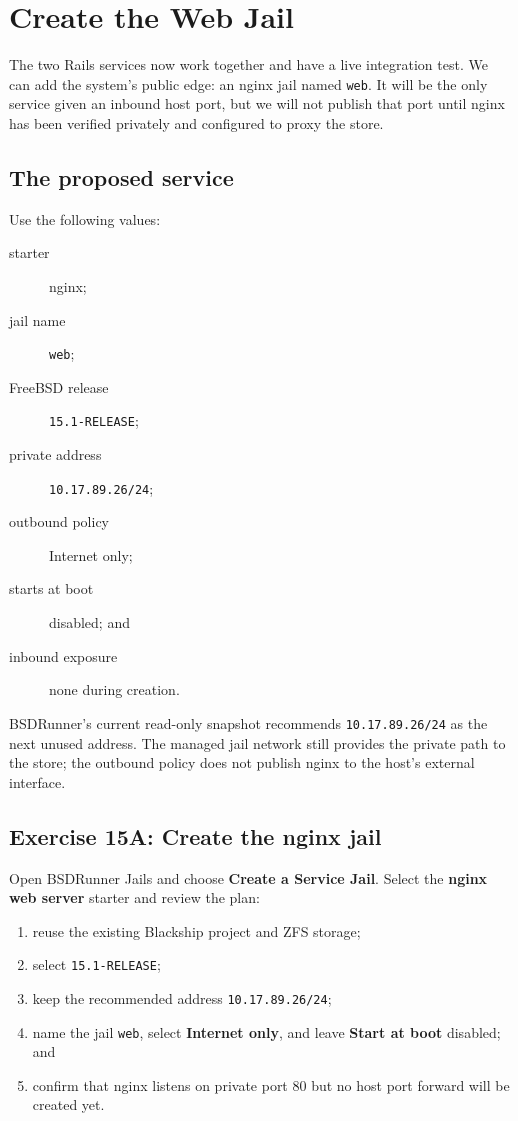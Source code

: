 \chapter{Create the Web Jail}

The two Rails services now work together and have a live integration test. We
can add the system's public edge: an nginx jail named \texttt{web}. It will be
the only service given an inbound host port, but we will not publish that port
until nginx has been verified privately and configured to proxy the store.

\section{The proposed service}

Use the following values:

\begin{description}
  \item[starter] nginx;
  \item[jail name] \texttt{web};
  \item[FreeBSD release] \texttt{15.1-RELEASE};
  \item[private address] \texttt{10.17.89.26/24};
  \item[outbound policy] Internet only;
  \item[starts at boot] disabled; and
  \item[inbound exposure] none during creation.
\end{description}

BSDRunner's current read-only snapshot recommends \texttt{10.17.89.26/24} as
the next unused address. The managed jail network still provides the private
path to the store; the outbound policy does not publish nginx to the host's
external interface.

\section{Exercise 15A: Create the nginx jail}

Open BSDRunner Jails and choose \textbf{Create a Service Jail}. Select the
\textbf{nginx web server} starter and review the plan:

\begin{enumerate}
  \item reuse the existing Blackship project and ZFS storage;
  \item select \texttt{15.1-RELEASE};
  \item keep the recommended address \texttt{10.17.89.26/24};
  \item name the jail \texttt{web}, select \textbf{Internet only}, and leave
    \textbf{Start at boot} disabled; and
  \item confirm that nginx listens on private port 80 but no host port forward
    will be created yet.
\end{enumerate}

